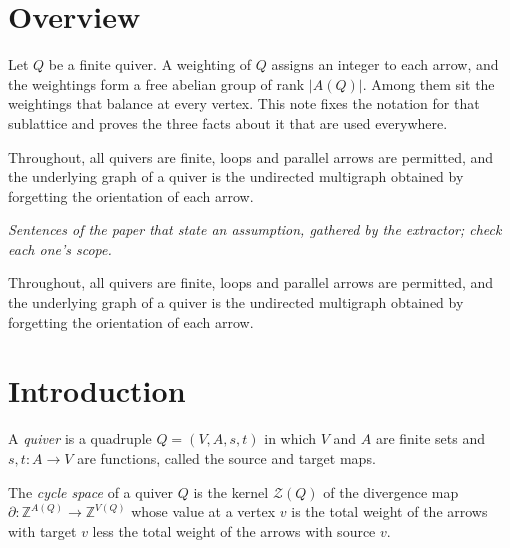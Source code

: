 
\section*{Overview}
Let $Q$ be a finite quiver. A weighting of $Q$ assigns an integer to each arrow, and the weightings form a free abelian group of rank $|A(Q)|$. Among them sit the weightings that balance at every vertex. This note fixes the notation for that sublattice and proves the three facts about it that are used everywhere.

Throughout, all quivers are finite, loops and parallel arrows are permitted, and the underlying graph of a quiver is the undirected multigraph obtained by forgetting the orientation of each arrow.

\begin{theorem}\label{Arden24A-setup}
\emph{Sentences of the paper that state an assumption, gathered by the extractor; check each one's scope.}

Throughout, all quivers are finite, loops and parallel arrows are permitted, and the underlying graph of a quiver is the undirected multigraph obtained by forgetting the orientation of each arrow.
\end{theorem}

\section{Introduction}\label{Arden24A-sec-1}

\begin{definition}\label{Arden24A-def-1.1}
\label{Arden24A-def:quiver}
A \emph{quiver} is a quadruple $Q = (V, A, s, t)$ in which $V$ and $A$ are finite sets and $s, t \colon A \to V$ are functions, called the source and target maps.
\end{definition}

\begin{definition}\label{Arden24A-def-1.2}
\label{Arden24A-def:cycle-space}
The \emph{cycle space} of a quiver $Q$ is the kernel $\mathcal{Z}(Q)$ of the divergence map $\partial \colon \mathbb{Z}^{A(Q)} \to \mathbb{Z}^{V(Q)}$ whose value at a vertex $v$ is the total weight of the arrows with target $v$ less the total weight of the arrows with source $v$.
\end{definition}

